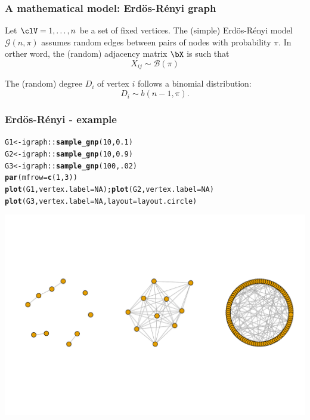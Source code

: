 \documentclass{beamer}\usepackage[]{graphicx}\usepackage[]{color}
\makeatletter
\newcommand{\hlnum}[1]{\textcolor[rgb]{0.686,0.059,0.569}{#1}}%
\newcommand{\hlopt}[1]{\textcolor[rgb]{0,0,0}{#1}}%
\newcommand{\hlstd}[1]{\textcolor[rgb]{0.345,0.345,0.345}{#1}}%
\newcommand{\hlkwb}[1]{\textcolor[rgb]{0.69,0.353,0.396}{#1}}%
\newcommand{\hlkwc}[1]{\textcolor[rgb]{0.333,0.667,0.333}{#1}}%
\newcommand{\hlkwd}[1]{\textcolor[rgb]{0.737,0.353,0.396}{\textbf{#1}}}%
\newenvironment{kframe}{%
 \def\at@end@of@kframe{}%
 \ifinner\ifhmode%
  \def\at@end@of@kframe{\end{minipage}}%
  \begin{minipage}{\columnwidth}%
 \fi\fi%
 \def\FrameCommand##1{\hskip\@totalleftmargin \hskip-\fboxsep
 \colorbox{shadecolor}{##1}\hskip-\fboxsep
     \hskip-\linewidth \hskip-\@totalleftmargin \hskip\columnwidth}%
 \MakeFramed {\advance\hsize-\width
   \@totalleftmargin\z@ \linewidth\hsize
   \@setminipage}}%
 {\par\unskip\endMakeFramed%
 \at@end@of@kframe}
\newenvironment{knitrout}{}{} %
\makeatother
\begin{document}
\begin{frame}
  \frametitle{A mathematical model: Erdös-Rényi graph}

  \begin{definition}
    Let $\clV = {1,\dots,n}$ be a set of fixed vertices. The (simple) Erdös-Rényi model $\mathcal{G}(n,\pi)$ assumes random edges between pairs of nodes with probability $\pi$. In orther word, the (random) adjacency matrix $\bX$ is such that
    \begin{equation*}
      X_{ij} \sim \mathcal{B}(\pi)
    \end{equation*}
  \end{definition}

  \vfill

  \begin{proposition}
    The (random) degree $D_i$ of vertex $i$ follows a binomial distribution:
      \begin{equation*}
        D_i \sim b(n-1, \pi).
      \end{equation*}
  \end{proposition}

\end{frame}

\begin{frame}[fragile]
  \frametitle{Erdös-Rényi - example}

\begin{knitrout}\scriptsize
{}\color{fgcolor}\begin{kframe}
\begin{alltt}
\hlstd{G1} \hlkwb{<-} \hlstd{igraph}\hlopt{::}\hlkwd{sample_gnp}\hlstd{(}\hlnum{10}\hlstd{,} \hlnum{0.1}\hlstd{)}
\hlstd{G2} \hlkwb{<-} \hlstd{igraph}\hlopt{::}\hlkwd{sample_gnp}\hlstd{(}\hlnum{10}\hlstd{,} \hlnum{0.9}\hlstd{)}
\hlstd{G3} \hlkwb{<-} \hlstd{igraph}\hlopt{::}\hlkwd{sample_gnp}\hlstd{(}\hlnum{100}\hlstd{,} \hlnum{.02}\hlstd{)}
\hlkwd{par}\hlstd{(}\hlkwc{mfrow}\hlstd{=}\hlkwd{c}\hlstd{(}\hlnum{1}\hlstd{,}\hlnum{3}\hlstd{))}
\hlkwd{plot}\hlstd{(G1,} \hlkwc{vertex.label}\hlstd{=}\hlnum{NA}\hlstd{) ;} \hlkwd{plot}\hlstd{(G2,} \hlkwc{vertex.label}\hlstd{=}\hlnum{NA}\hlstd{)}
\hlkwd{plot}\hlstd{(G3,} \hlkwc{vertex.label}\hlstd{=}\hlnum{NA}\hlstd{,} \hlkwc{layout}\hlstd{=layout.circle)}
\end{alltt}
\end{kframe}
\includegraphics[width=.8\textwidth]{figures/ER_example-1} 
\end{knitrout}
\end{frame}
\end{document}
